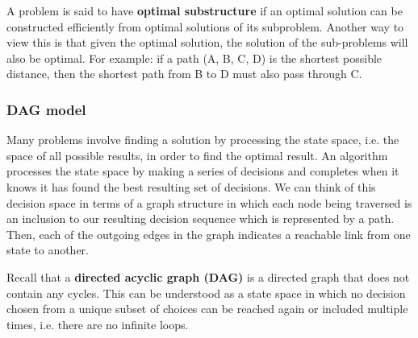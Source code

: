 \documentclass{article}
\begin{document}
    A problem is said to have \textbf{optimal substructure} if an optimal solution can be constructed efficiently from optimal solutions of its subproblem. Another way to view this is that given the optimal solution, the solution of the sub-problems will also be optimal. For example: if a path (A, B, C, D) is the shortest possible distance, then the shortest path from B to D must also pass through C.
    
   \subsubsection{DAG model}
    Many problems involve finding a solution by processing the state space, i.e. the space of all possible results, in order to find the optimal result. An algorithm processes the state space by making a series of decisions and completes when it knows it has found the best resulting set of decisions. We can think of this decision space in terms of a graph structure in which each node being traversed is an inclusion to our resulting decision sequence which is represented by a path. Then, each of the outgoing edges in the graph indicates a reachable link from one state to another. 
    
    Recall that a \textbf{directed acyclic graph (DAG)} is a directed graph that does not contain any cycles. This can be understood as a state space in which no decision chosen from a unique subset of choices can be reached again or included multiple times, i.e. there are no infinite loops.
    
\end{document}
